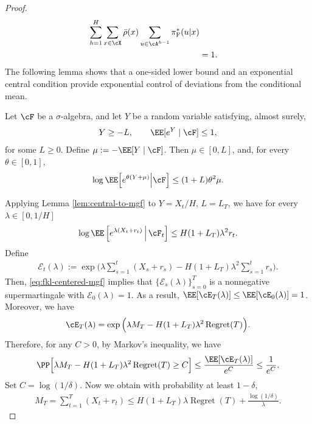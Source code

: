 \documentclass[11pt]{article}
\newcommand{\pif}{\pi_{\mathrm{F}}}
\begin{document}
\begin{proof}
\begin{align}
    \sum_{h=1}^H
    \sum_{x\in\cX}
    \bar\rho(x)
    \sum_{u\in\cA^{h-1}}
    \pif^*(u|x)
    \notag\\
    &=1.
    \label{eq:proof-Xt-central-condition}
\end{align}
The following lemma shows that a one-sided lower bound and an exponential central condition provide exponential control of deviations from the conditional mean.
\begin{lemma}
\label{lem:central-to-mgf}
Let $\cF$ be a $\sigma$-algebra, and let $Y$ be a random variable satisfying,
almost surely,
\begin{align}
\notag
    Y\geq-L,
    \qquad
    \EE[e^Y\mid\cF]\leq1,
\end{align}
for some $L\geq0$. Define $ \mu:=-\EE[Y\mid\cF]$. Then $\mu\in[0,L]$, and, for every $\theta\in[0,1]$,
\begin{align}
    \log
    \EE\Big[
        e^{\theta(Y+\mu)}
        \Big|
        \cF
    \Big]
    \leq
    (1+L)\theta^2\mu.
\notag
\end{align}
\end{lemma}
Applying Lemma \ref{lem:central-to-mgf} to $Y = X_t/H$, $L=L_T$, we have for every $\lambda\in[0,1/H]$
\begin{align}
    \log
    \EE\left[
        e^{\lambda(X_t+r_t)}
        \,\middle|\,
        \cF_t
    \right]
    \leq
    H(1+L_T)\lambda^2r_t.
    \label{eq:fkl-centered-mgf}
\end{align}
Define
\begin{align*}
    \mathcal E_t(\lambda)
    :=
    \exp\bigg(
        \lambda\sum_{s=1}^t(X_s+r_s)
        -
        H(1+L_T)\lambda^2\sum_{s=1}^t r_s
    \bigg).
\end{align*}
Then, \eqref{eq:fkl-centered-mgf} implies that $\{\mathcal E_s(\lambda)\}_{s=0}^T$ is a nonnegative supermartingale with
$\mathcal E_0(\lambda)=1$. As a result, $\EE[\cE_T(\lambda)] \le \EE[\cE_0(\lambda)]=1$. Moreover, we have
\begin{align*}
    \cE_T(\lambda)= \exp\Big(\lambda M_T - H(1+L_T)\lambda^2 \operatorname{Regret}(T)\Big).
\end{align*}
Therefore, for any $C > 0$, by Markov's inequality, we have
\begin{align*}
    \PP \Big[\lambda M_T - H(1+L_T)\lambda^2 \operatorname{Regret}(T) \ge C\Big] \le \frac{\EE[\cE_T(\lambda)]}{e^C} \le \frac{1}{e^C}.
\end{align*}
Set $C = \log(1/\delta)$. Now we obtain with probability at least $1-\delta$,
\begin{align}
    M_T = \sum_{t=1}^T(X_t+r_t)
    \leq
    H(1+L_T)\lambda\operatorname{Regret}(T)
    +
    \frac{\log(1/\delta)}{\lambda}.
    \label{eq:fkl-martingale-bound}
\end{align}


\end{proof}
\end{document}
